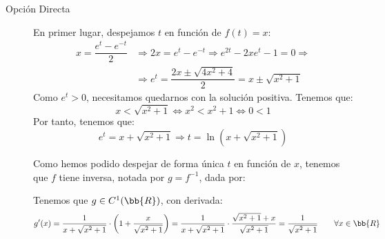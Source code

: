 \documentclass[12pt]{article}
\begin{document}
\begin{ejercicio}
\begin{description}
            \item[Opción Directa]
            
            En primer lugar, despejamos $t$ en función de $f(t)=x$:
            \begin{align*}
                x=\dfrac{e^t - e^{-t}}{2} &\Longrightarrow 2x = e^t - e^{-t} \Longrightarrow e^{2t} - 2xe^t - 1 = 0
                \Longrightarrow \\& \Longrightarrow e^t = \dfrac{2x\pm \sqrt{4x^2+4}}{2} = x\pm \sqrt{x^2+1}
            \end{align*}
            Como $e^t>0$, necesitamos quedarnos con la solución positiva. Tenemos que:
            \begin{equation*}
                x<\sqrt{x^2+1} \Longleftrightarrow
                x^2<x^2+1 \Longleftrightarrow
                0<1
            \end{equation*}
            Por tanto, tenemos que:
            \begin{equation*}
                e^t = x + \sqrt{x^2+1} \Longrightarrow t = \ln(x + \sqrt{x^2+1})
            \end{equation*}

            Como hemos podido despejar de forma única $t$ en función de $x$, tenemos que $f$ tiene inversa, notada por $g=f^{-1}$, dada por:

            Tenemos que $g\in C^1(\bb{R})$, con derivada:
            \begin{equation*}
                g'(x) = \dfrac{1}{x + \sqrt{x^2+1}}\cdot \left(1 + \dfrac{x}{\sqrt{x^2+1}}\right) = \dfrac{1}{x+\sqrt{x^2+1}}\cdot \dfrac{\sqrt{x^2+1}+x}{\sqrt{x^2+1}} = \dfrac{1}{\sqrt{x^2+1}} \qquad \forall x\in \bb{R}
            \end{equation*}
        \end{description}
        
    \end{ejercicio}
\end{document}
